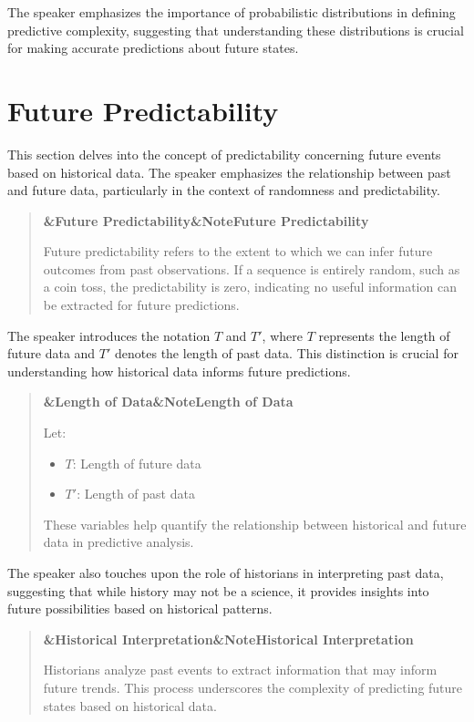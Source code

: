 \documentclass[a4paper]{article}
\newcommand{\boxheading}[1]{%
  \par\smallskip
  \noindent\textbf{\ifx&#1&Note\else#1\fi}\par
  \smallskip
}
\newenvironment{defbox}[1][]{%
  \begin{quote}\color{green!40!black}\boxheading{#1}\normalcolor
}{\end{quote}}
\newenvironment{exbox}[1][]{%
  \begin{quote}\color{brown!70!black}\boxheading{#1}\normalcolor
}{\end{quote}}
\newenvironment{rembox}[1][]{%
  \begin{quote}\color{black!70}\boxheading{#1}\normalcolor
}{\end{quote}}
\begin{document}
The speaker emphasizes the importance of probabilistic distributions in defining predictive complexity, suggesting that understanding these distributions is crucial for making accurate predictions about future states.

\section{Future Predictability}
This section delves into the concept of predictability concerning future events based on historical data. The speaker emphasizes the relationship between past and future data, particularly in the context of randomness and predictability.

\begin{rembox}[Future Predictability]
Future predictability refers to the extent to which we can infer future outcomes from past observations. If a sequence is entirely random, such as a coin toss, the predictability is zero, indicating no useful information can be extracted for future predictions.
\end{rembox}

The speaker introduces the notation \( T \) and \( T' \), where \( T \) represents the length of future data and \( T' \) denotes the length of past data. This distinction is crucial for understanding how historical data informs future predictions.

\begin{defbox}[Length of Data]
Let:
\begin{itemize}
    \item \( T \): Length of future data
    \item \( T' \): Length of past data
\end{itemize}
These variables help quantify the relationship between historical and future data in predictive analysis.
\end{defbox}

The speaker also touches upon the role of historians in interpreting past data, suggesting that while history may not be a science, it provides insights into future possibilities based on historical patterns.

\begin{exbox}[Historical Interpretation]
Historians analyze past events to extract information that may inform future trends. This process underscores the complexity of predicting future states based on historical data.
\end{exbox}
\end{document}
